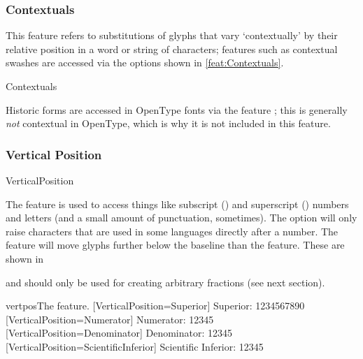 \documentclass[a4paper]{l3doc}
\begin{document}
\subsubsection{Contextuals}
This feature refers to substitutions of glyphs that vary `contextually' by their relative position in a word or string of characters;
features such as contextual swashes are accessed via the options shown in \ref{feat:Contextuals}.

\begin{features}{Contextuals}
\end{features}

Historic forms are accessed in OpenType
fonts via the feature ; this is generally \emph{not}
contextual in OpenType, which is why it is not included in this feature.

\subsubsection{Vertical Position}

\begin{features}{VerticalPosition}
\end{features}

The  feature is used to access things like
subscript () and superscript () numbers and
letters (and a small amount of punctuation, sometimes).
The  option will only raise characters that are used
in some languages directly after a number.
The  feature will move glyphs
further below the baseline than the  feature.
These are shown in 

 and  should only be used for creating
arbitrary fractions (see next section).

\begin{Lexample}{vertpos}{The  feature.}
  [VerticalPosition=Superior]
   Superior: 1234567890                                   \\
  [VerticalPosition=Numerator]
   Numerator: 12345                                       \\
  [VerticalPosition=Denominator]
   Denominator: 12345                                     \\
  [VerticalPosition=ScientificInferior]
   Scientific Inferior: 12345
\end{Lexample}
\end{document}
